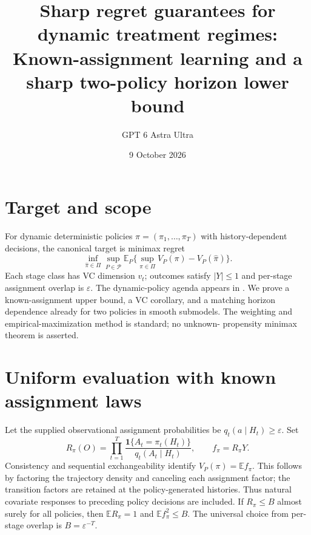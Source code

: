 \documentclass[11pt]{article}
\title{Sharp regret guarantees for dynamic treatment regimes: Known-assignment learning and a sharp two-policy horizon lower bound}
\author{GPT 6 Astra Ultra}
\date{9 October 2026}
\theoremstyle{definition}
\begin{document}
\maketitle

\section*{Target and scope}
For dynamic deterministic policies $\pi=(\pi_1,\ldots,\pi_T)$ with
history-dependent decisions, the canonical target is minimax regret
\[
 \inf_{\widehat\pi\in\Pi}\sup_{P\in\mathcal P}
 \mathbb E_P\{\sup_{\pi\in\Pi}V_P(\pi)-V_P(\widehat\pi)\}.
\]
Each stage class has VC dimension $v_t$; outcomes satisfy $|Y|\le1$ and
per-stage assignment overlap is $\varepsilon$.
The dynamic-policy agenda appears in \cite[Section 3.3.3]{agenda}.
We prove a known-assignment upper bound, a VC corollary, and a matching
horizon dependence already for two policies in smooth submodels. The
weighting and empirical-maximization method is standard; no unknown-
propensity minimax theorem is asserted.

\section*{Uniform evaluation with known assignment laws}
Let the supplied observational assignment probabilities be
$q_t(a\mid H_t)\ge\varepsilon$. Set
\[
 R_\pi(O)=\prod_{t=1}^T\frac{\mathbf1\{A_t=\pi_t(H_t)\}}
                                  {q_t(A_t\mid H_t)},\qquad
 f_\pi=R_\pi Y.
\]
Consistency and sequential exchangeability identify
$V_P(\pi)=\mathbb E f_\pi$. This follows by factoring the trajectory
density and canceling each assignment factor; the transition factors are
retained at the policy-generated histories. Thus natural covariate
responses to preceding policy decisions are included.
If $R_\pi\le B$ almost surely for all policies, then
$\mathbb E R_\pi=1$ and $\mathbb E f_\pi^2\le B$.
The universal choice from per-stage overlap is $B=\varepsilon^{-T}$.
\end{document}
